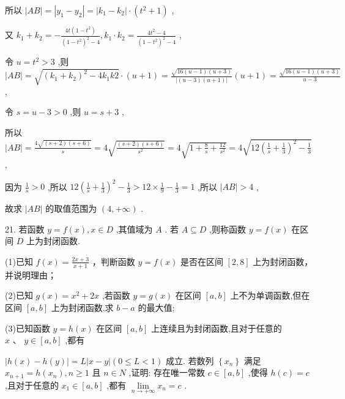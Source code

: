 \documentclass[10pt]{article}
\begin{document}
所以 \(\left| {AB}\right|  = \left| {{y}_{1} - {y}_{2}}\right|  = \left| {{k}_{1} - {k}_{2}}\right|  \cdot  \left( {{t}^{2} + 1}\right)\) ,

又 \({k}_{1} + {k}_{2} =  - \frac{{4t}\left( {1 - {t}^{2}}\right) }{{\left( 1 - {t}^{2}\right) }^{2} - 4},{k}_{1} \cdot  {k}_{2} = \frac{4{t}^{2} - 4}{{\left( 1 - {t}^{2}\right) }^{2} - 4}\) ,

令 \(u = {t}^{2} > 3\) ,则 \(\left| {AB}\right|  = \sqrt{{\left( {k}_{1} + {k}_{2}\right) }^{2} - 4{k}_{1}{k2}} \cdot  \left( {u + 1}\right)  = \frac{\sqrt{{16}\left( {u - 1}\right) \left( {u + 3}\right) }}{\left| \left( u - 3\right) \left( u + 1\right) \right| }\left( {u + 1}\right)  = \frac{\sqrt{{16}\left( {u - 1}\right) \left( {u + 3}\right) }}{u - 3}\) ,

令 \(s = u - 3 > 0\) ,则 \(u = s + 3\) ,

所以 \(\left| {AB}\right|  = \frac{4\sqrt{\left( {s + 2}\right) \left( {s + 6}\right) }}{s} = 4\sqrt{\frac{\left( {s + 2}\right) \left( {s + 6}\right) }{{s}^{2}}} = 4\sqrt{1 + \frac{8}{s} + \frac{12}{{s}^{2}}} = 4\sqrt{{12}{\left( \frac{1}{s} + \frac{1}{3}\right) }^{2} - \frac{1}{3}}\) ,

因为 \(\frac{1}{s} > 0\) ,所以 \({12}{\left( \frac{1}{s} + \frac{1}{3}\right) }^{2} - \frac{1}{3} > {12} \times  \frac{1}{9} - \frac{1}{3} = 1\) ,所以 \(\left| {AB}\right|  > 4\) ,

故求 \(\left| {AB}\right|\) 的取值范围为 \(\left( {4, + \infty }\right)\) .

21. 若函数 \(y = f\left( x\right) ,x \in  D\) ,其值域为 \(A\) . 若 \(A \subseteq  D\) ,则称函数 \(y = f\left( x\right)\) 在区间 \(D\) 上为封闭函数.

(1)已知 \(f\left( x\right)  = \frac{{2x} + 3}{x + 1}\) ，判断函数 \(y = f\left( x\right)\) 是否在区间 \(\left\lbrack  {2,8}\right\rbrack\) 上为封闭函数，并说明理由；

(2)已知 \(g\left( x\right)  = {x}^{2} + {2x}\) ,若函数 \(y = g\left( x\right)\) 在区间 \(\left\lbrack  {a,b}\right\rbrack\) 上不为单调函数,但在区间 \(\left\lbrack  {a,b}\right\rbrack\) 上为封闭函数,求 \(b - a\) 的最大值;

(3)已知函数 \(y = h\left( x\right)\) 在区间 \(\left\lbrack  {a,b}\right\rbrack\) 上连续且为封闭函数,且对于任意的 \(x\text{ 、 }y \in  \left\lbrack  {a,b}\right\rbrack\) ,都有

\(\left| {h\left( x\right)  - h\left( y\right) }\right|  = L\left| {x - y}\right| \left( {0 \leq  L < 1}\right)\) 成立. 若数列 \(\left\{  {x}_{n}\right\}\) 满足 \({x}_{n + 1} = h\left( {x}_{n}\right) ,n \geq  1\) 且 \(n \in  N\) ,证明: 存在唯一常数 \(c \in  \left\lbrack  {a,b}\right\rbrack\) ,使得 \(h\left( c\right)  = c\) ,且对于任意的 \({x}_{1} \in  \left\lbrack  {a,b}\right\rbrack\) ,都有 \(\mathop{\lim }\limits_{{n \rightarrow   + \infty }}{x}_{n} = c\) .
\end{document}
